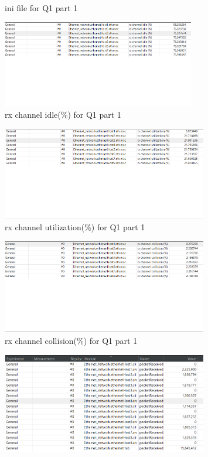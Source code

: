 \begin{qsolve}
\begin{qsolve}[]
\begin{figure}[H]
            \caption{ini file for Q1 part 1}
        \end{figure}
        \begin{figure}[H]
            \centering
            \includegraphics[width=0.75\textwidth]{output1.png}
            \caption{rx channel idle(\%) for Q1 part 1}
        \end{figure}
        \splitqsolve[\splitqsolve]
        \begin{figure}[H]
            \centering
            \includegraphics[width=0.8\textwidth]{output2.png}
            \caption{rx channel utilization(\%) for Q1 part 1}
        \end{figure}
        \begin{figure}[H]
            \centering
            \includegraphics[width=0.8\textwidth]{output3.png}
            \caption{rx channel collision(\%) for Q1 part 1}
        \end{figure}
        \begin{figure}[H]
            \centering
            \includegraphics[width=0.8\textwidth]{output4.png}

\end{figure}
\end{qsolve}
\end{qsolve}
